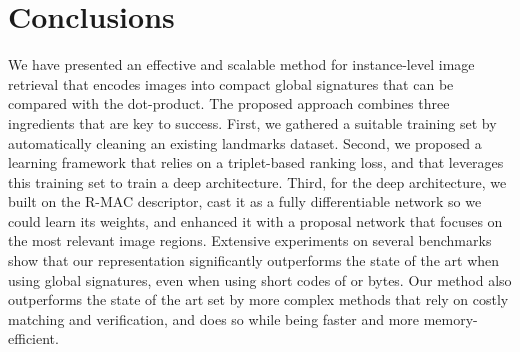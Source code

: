 \documentclass[twocolumn]{svjour3}          \smartqed  \usepackage{graphicx}
\begin{document}
\section{Conclusions}
 \label{sec:conclusions}

 We have presented an effective and scalable method for instance-level image retrieval that encodes images into compact global signatures that can be compared with the dot-product.
 The proposed approach combines three ingredients that are key to success. First, we gathered a suitable training set by automatically cleaning an existing landmarks dataset. Second, we proposed a learning framework that relies on a triplet-based ranking loss, and that leverages this training set to train a deep architecture. Third, for the deep architecture, we built on the R-MAC descriptor, cast it as a fully differentiable network so we could learn its weights, and enhanced it with a proposal network that focuses on the most relevant image regions.
 Extensive experiments on several benchmarks show that our representation significantly outperforms the state of the art when using global signatures, even when using short codes of  or  bytes.
Our method also outperforms the state of the art set by more complex methods that rely on costly matching and verification, and does so while being faster and more memory-efficient.












         
\end{document}
